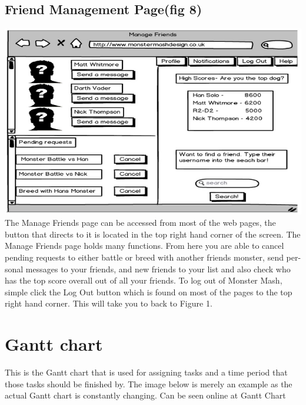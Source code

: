 \documentclass{project}
\begin{document}
\subsection{Friend Management Page(fig 8)}
\includegraphics[scale=0.5]{manageFriends.jpg}\\
The Manage Friends page can be accessed from most of the web pages, the button
that directs to it is located in the top right hand corner of the screen.
The Manage Friends page holds many functions. From here you are able to cancel
pending requests to either battle or breed with another friends monster, send per-
sonal messages to your friends, and new friends to your list and also check who has
the top score overall out of all your friends.
To log out of Monster Mash, simple click the Log Out button which is found on
most of the pages to the top right hand corner. This will take you to back to Figure
1.
\section{Gantt chart}
This is the Gantt chart that is used for assigning tasks and a time period that those
tasks should be finished by. The image below is merely an example as the actual
Gantt chart is constantly changing. Can be seen online at
Gantt Chart
\end{document}
